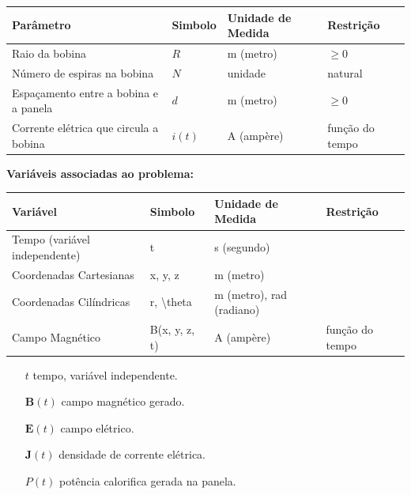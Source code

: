 \documentclass[
	article,			%
	11pt,				%
	oneside,			%
	a4paper,			%
	english,			%
	brazil,				%
	sumario=tradicional
	]{abntex2}
\begin{document}
\begin{table}[h]
	\begin{tabular}{@{}llll@{}}
		\toprule
		\textbf{Parâmetro}                     & \textbf{Simbolo} & \textbf{Unidade de Medida} & \textbf{Restrição} \\ \midrule
		Raio da bobina                         & $ R $            & m (metro)                  & $ \ge 0 $          \\
		Número de espiras na bobina            & $ N $            & unidade                    & natural            \\
		Espaçamento entre a bobina e a panela  & $ d $            & m (metro)                  & $ \ge 0 $          \\
		Corrente elétrica que circula a bobina & $ i(t) $         & A (ampère)                 & função do tempo    \\ \bottomrule
	\end{tabular}
\end{table}

\textbf{Variáveis associadas ao problema:}

\begin{table}[h]
	\begin{tabular}{@{}llll@{}}
		\toprule
		Variável                      & Simbolo                  & \textbf{Unidade de Medida}        & \textbf{Restrição}       \\ \midrule
		Tempo (variável independente) & t                        & s (segundo)              &                 \\ 
		Coordenadas Cartesianas       & x, y, z                  & m (metro)                &                 \\ 
		Coordenadas Cilíndricas       & r, \textbackslash{}theta & m (metro), rad (radiano) &                 \\ 
		Campo Magnético               & B(x, y, z, t)            & A (ampère)               & função do tempo \\ \bottomrule
	\end{tabular}
\end{table}

\begin{itemize}
	\item[$ t $] tempo, variável independente.
	\item[$ \textbf{B}(t) $] campo magnético gerado.
	\item[$ \textbf{E}(t) $] campo elétrico.
	\item[$ \textbf{J}(t) $] densidade de corrente elétrica.
	\item[$ P(t) $] potência calorifica gerada na panela.
\end{itemize}
\end{document}
